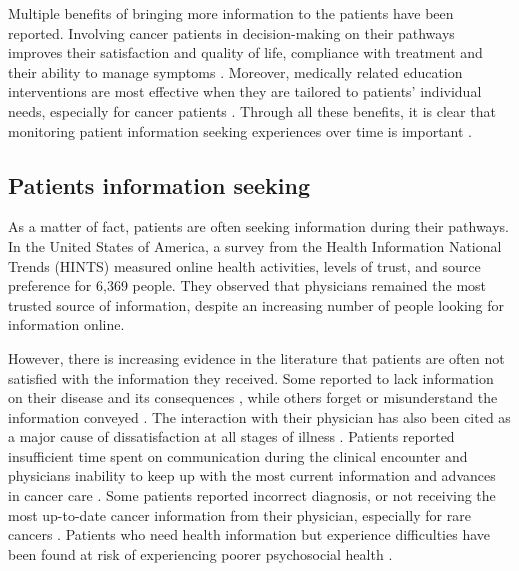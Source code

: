 Multiple benefits of bringing more information to the patients have been reported. Involving cancer patients in decision-making on their pathways improves their satisfaction and quality of life, compliance with treatment and their ability to manage symptoms \cite{johnson_effects_1982,hack_feasibility_1999,mohide_randomised_1996,mcpherson_effective_2001, sheabudgell_information_2014,huchcroft_testing_1984,cegala_patient_2003,viswanath_science_2005}. Moreover, medically related education interventions are most effective when they are tailored to patients' individual needs, especially for cancer patients \cite{cegala_patient_2003}. Through all these benefits, it is clear that monitoring patient information seeking experiences over time is important \cite{finney_rutten_cancer-related_2016}.

\subsection{Patients information seeking}

As a matter of fact, patients are often seeking information during their pathways. In the United States of America, a survey from the Health Information National Trends (HINTS) \cite{hesse_trust_2005} measured online health activities, levels of trust, and source preference for 6,369 people. They observed that physicians remained the most trusted source of information, despite an increasing number of people looking for information online.

However, there is increasing evidence in the literature that patients are often not satisfied with the information they received. Some reported to lack information on their disease and its consequences \cite{mcpherson_effective_2001}, while others forget or misunderstand the information conveyed \cite{ley_communicating_1988,hogbin_getting_1989}. The interaction with their physician has also been cited as a major cause of dissatisfaction \cite{stewart_effective_1995,bartlett_effects_1984} at all stages of illness \cite{higginson_palliative_1990}. Patients reported insufficient time spent on communication during the clinical encounter and physicians inability to keep up with the most current information and advances in cancer care \cite{anderson_impact_2003}. Some patients reported incorrect diagnosis, or not receiving the most up-to-date cancer information from their physician, especially for rare cancers \cite{dolce_internet_2011}. Patients who need health information but experience difficulties have been found at risk of experiencing poorer psychosocial health \cite{arora_barriers_2002}.

